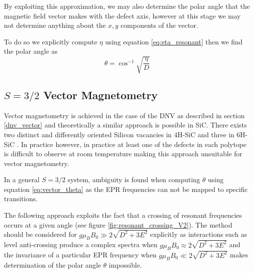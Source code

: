 By exploiting this approximation, we may also determine the polar angle that the magnetic field vector makes with the defect axis, however at this stage we may not determine anything about the $x,y$ components of the vector. 

To do so we explicitly compute $\eta$ using equation \eqref{eq:eta_resonant} then we find the polar angle as 
\begin{equation}
    \theta = \cos^{-1}\sqrt{\frac{\eta}{D}}
    \label{eq:vector_theta}
\end{equation}


\subsection{$S = 3/2$ Vector Magnetometry}
Vector magnetometry is achieved in the case of the DNV as described in section \ref{dnv_vector}  and theoretically a similar approach is possible in SiC. There exists two distinct and differently oriented Silicon vacancies in 4H-SiC and three in 6H-SiC \cite{Janzn2009}. In practice however, in practice at least one of the defects in each polytope is difficult to observe at room temperature making this approach unsuitable for vector magnetometry. 

In a general $S = 3/2$ system, ambiguity is found when computing $\theta$ using equation \eqref{eq:vector_theta} as the EPR frequencies can not be mapped to specific transitions. 

The following approach exploits the fact that a crossing of resonant frequencies occurs at a given angle (see figure \ref{fig:resonant_crossing_V2}). The method should be considered for $g\mu_B B_0 \gg 2\sqrt{D^2 + 3E^2}$ explicitly as interactions such as level anti-crossing produce a complex spectra \cite{Degen2008} when $g\mu_B B_0 \approx 2\sqrt{D^2 + 3E^2}$ and the invariance of a particular EPR frequency when $g \mu_B B_0 \ll 2 \sqrt{D^2 + 3E^2}$ makes determination of the polar angle $\theta$ impossible. 

